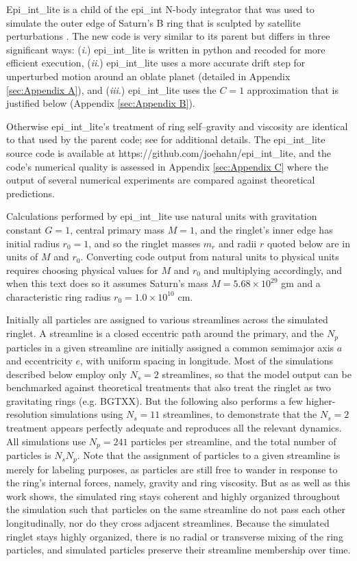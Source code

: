 \documentclass[preprint]{aastex62}
\begin{document}
Epi\_int\_lite is a child of the epi\_int N-body integrator that was used to
simulate the outer edge of Saturn's B ring that is sculpted by satellite perturbations
\citep{HS13}. The new code is very similar to its parent but differs in three significant ways:
({\it i}.) epi\_int\_lite is written in python and recoded for more efficient execution,
({\it ii}.) epi\_int\_lite uses a more accurate drift step for 
unperturbed motion around an oblate planet (detailed in Appendix \ref{sec:Appendix A}),
and ({\it iii}.) epi\_int\_lite uses the $C=1$ approximation that is justified below 
(Appendix \ref{sec:Appendix B}).

Otherwise epi\_int\_lite's treatment of ring self--gravity and viscosity are identical
to that used by the parent code; see \cite{HS13} for additional details. The epi\_int\_lite 
source code is available at https://github.com/joehahn/epi\_int\_lite, and the
code's numerical quality is assessed in Appendix \ref{sec:Appendix C}
where the output of several numerical experiments are compared against theoretical predictions.

Calculations performed by epi\_int\_lite use natural units with gravitation constant $G=1$, 
central primary mass $M=1$, and the ringlet's inner edge has initial radius
$r_0=1$, and so the ringlet masses $m_r$ and radii $r$ quoted below are in units of $M$ and $r_0$.
Converting code output from natural units to physical units requires choosing	
physical values for $M$ and $r_0$ and multiplying accordingly, and when this text does so
it assumes Saturn's mass $M=5.68\times10^{29}$ gm and a characteristic
ring radius $r_0=1.0\times10^{10}$ cm.

Initially all particles are assigned to various streamlines across the simulated ringlet. A streamline
is a closed eccentric path around the primary, and the $N_p$ particles in a given
streamline are initially assigned a common semimajor axis $a$ and eccentricity $e$, 
with uniform spacing in longitude. Most of the simulations described below
employ only $N_s=2$ streamlines, so that the model output can be benchmarked against
theoretical treatments that also treat the ringlet as two gravitating rings
(e.g. BGTXX). But the following also performs a few higher-resolution simulations
using $N_s=11$ streamlines, to demonstrate that the $N_s=2$ treatment appears perfectly
adequate and reproduces all the relevant dynamics. All simulations use $N_p=241$ particles 
per streamline, and the total number of particles is $N_sN_p$.
Note that the assignment of particles to a given streamline is merely
for labeling purposes, as particles are still free to wander in response
to the ring’s internal forces, namely, gravity and ring viscosity. But as \cite{HS13} as well
as this work shows, the simulated ring stays coherent and highly organized throughout the 
simulation such that particles on the same streamline do not pass each other longitudinally,
nor do they cross adjacent streamlines. Because the simulated ringlet stays highly organized,
there is no radial or transverse mixing of the ring particles, and simulated particles preserve
their streamline membership over time.
\end{document}
